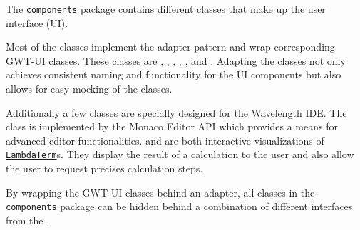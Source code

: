The \texttt{components} package contains different classes that make up the user interface (UI).

Most of the classes implement the adapter pattern and wrap corresponding GWT-UI classes. 
These classes are \texttt{}, \texttt{}, \texttt{}, 
\texttt{}, \texttt{}, \texttt{} and \texttt{}.
Adapting the classes not only achieves consistent naming and functionality for the UI components
but also allows for easy mocking of the classes.

Additionally a few classes are specially designed for the Wavelength IDE. The \texttt{} 
class is implemented by the Monaco Editor API which provides a means for advanced editor functionalities. 
\texttt{} and \texttt{} are both interactive visualizations of 
\texttt{\hyperref[type:edu.kit.wavelength.client.model.term.LambdaTerm]{LambdaTerm}}s. They display 
the result of a calculation to the user and also allow the user to request precises calculation steps.

By wrapping the GWT-UI classes behind an adapter, all classes in the \texttt{components} package can
be hidden behind a combination of different interfaces from the \texttt{}.
